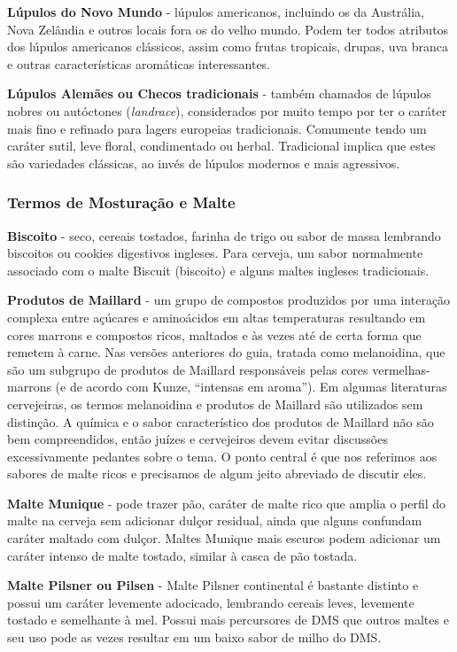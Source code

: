 \textbf{Lúpulos do Novo Mundo} - lúpulos americanos, incluindo os da Austrália, Nova Zelândia e outros locais fora os do velho mundo. Podem ter todos atributos dos lúpulos americanos clássicos, assim como frutas tropicais, drupas, uva branca e outras características aromáticas interessantes.

\textbf{Lúpulos Alemães ou Checos tradicionais} - também chamados de lúpulos nobres ou autóctones (\textit{landrace}), considerados por muito tempo por ter o caráter mais fino e refinado para lagers europeias tradicionais. Comumente tendo um caráter sutil, leve floral, condimentado ou herbal. Tradicional implica que estes são variedades clássicas, ao invés de lúpulos modernos e mais agressivos.
\subsubsection*{Termos de Mosturação e Malte}
\textbf{Biscoito} - seco, cereais tostados, farinha de trigo ou sabor de massa lembrando biscoitos ou cookies digestivos ingleses. Para cerveja, um sabor normalmente associado com o malte Biscuit (biscoito) e alguns maltes ingleses tradicionais.

\textbf{Produtos de Maillard} - um grupo de compostos produzidos por uma interação complexa entre açúcares e aminoácidos em altas temperaturas resultando em cores marrons e compostos ricos, maltados e às vezes até de certa forma que remetem à carne. Nas versões anteriores do guia, tratada como melanoidina, que são um subgrupo de produtos de Maillard responsáveis pelas cores vermelhas-marrons (e de acordo com Kunze, “intensas em aroma”). Em algumas literaturas cervejeiras, os termos melanoidina e produtos de Maillard são utilizados sem distinção. A química e o sabor característico dos produtos de Maillard não são bem compreendidos, então juízes e cervejeiros devem evitar discussões excessivamente pedantes sobre o tema. O ponto central é que nos referimos aos sabores de malte ricos e precisamos de algum jeito abreviado de discutir eles.

\textbf{Malte Munique} - pode trazer pão, caráter de malte rico que amplia o perfil do malte na cerveja sem adicionar dulçor residual, ainda que alguns confundam caráter maltado com dulçor. Maltes Munique mais escuros podem adicionar um caráter intenso de malte tostado, similar à casca de pão tostada.

\textbf{Malte Pilsner ou Pilsen} - Malte Pilsner continental é bastante distinto e possui um caráter levemente adocicado, lembrando cereais leves, levemente tostado e semelhante à mel. Possui mais percursores de DMS que outros maltes e seu uso pode as vezes resultar em um baixo sabor de milho do DMS.

